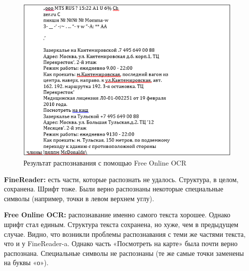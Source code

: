 			\begin{figure}[h]
				\centering
				\includegraphics[width=0.7\linewidth]{images/free-online-screen}
				\caption{Результат распознавания с помощью Free Online OCR}
				\label{fig:free-online-screen}
			\end{figure}
		
		\FloatBarrier
		
		\textbf{FineReader:} есть части, которые распознать не удалось. Структура, в целом, сохранена. Шрифт тоже. Были верно распознаны некоторые специальные символы (например, точки в левом верхнем углу).
		
		\textbf{Free Online OCR:} распознавание именно самого текста хорошее. Однако шрифт стал единым. Структура текста сохранена, но хуже, чем в предыдущем случае. Видно, что возникли проблемы распознавания с теми же частями текста, что и у FineReader-a. Однако часть «Посмотреть на карте» была почти верно распознана. Специальные символы не распознаны (те же самые точки заменены на буквы «о»).
			 	

